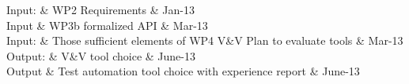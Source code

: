 \documentclass{template/openetcs_article}
\begin{document}

\begin{inoutput}
Input: & WP2 Requirements & Jan-13 \\
Input  & WP3b formalized API & Mar-13 \\ 
Input: & Those sufficient elements of WP4 V\&V Plan to evaluate tools & Mar-13 \\
\hline
Output: & V\&V tool choice & June-13 \\
Output  &  Test automation tool choice with experience report & June-13 \\
\end{inoutput}
\end{document}

